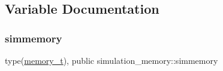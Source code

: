 \subsection{Variable Documentation}
\mbox{\label{namespacesimulation__memory_a8ed2bc20b0c49405084442d02fc76d42}} 
\subsubsection{\texorpdfstring{simmemory}{simmemory}}
{\footnotesize\ttfamily type(\hyperlink{structsimulation__memory_1_1memory__t}{memory\+\_\+t}), public simulation\+\_\+memory\+::simmemory}

